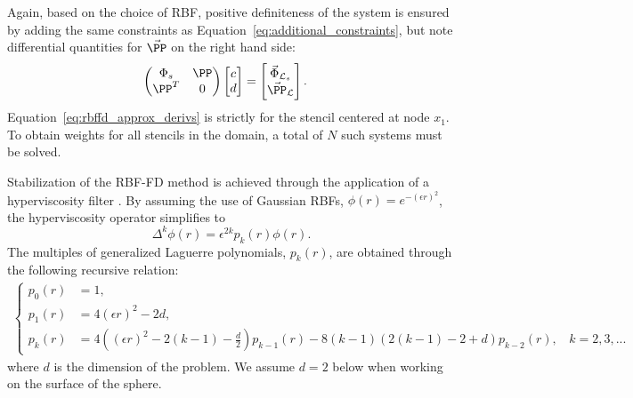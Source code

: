 	
Again, based on the choice of RBF, positive definiteness of the system is ensured by adding the same constraints as Equation~\ref{eq:additional_constraints}, but note differential quantities for $\vec{\PP}$ on the right hand side: 
	\begin{align}
		\begin{pmatrix}
		\Phi_s & \PP \\
		\PP^T & 0
		\end{pmatrix} \begin{bmatrix}
							c \\ 
							d
							\end{bmatrix}
				 &= \begin{bmatrix}
							\vec{\Phi}_{\diffop{}_s} \\
							\vec{\PP}_{\diffop{}}
							 \end{bmatrix}.
	\end{align}
Equation~\ref{eq:rbffd_approx_derivs} is strictly for the stencil centered at node $x_1$. To obtain weights for all stencils in the domain, a total of $N$ such systems must be solved. %


Stabilization of the RBF-FD method is achieved through the application of a hyperviscosity filter \cite{Fornberg2011b}. By assuming the use of Gaussian RBFs, $\phi(r) = e^{-(\epsilon r)^2}$, the hyperviscosity operator simplifies to
\begin{equation}
\Delta^{k}\phi(r) = \epsilon^{2k} p_k(r) \phi(r).
\label{eqn:gaussian_hv}
\end{equation}
The multiples of generalized Laguerre polynomials, $p_k(r)$, are obtained through the following recursive relation:
\begin{align*}
\begin{cases} 
p_0(r) &=1, \\
p_1(r) &= 4(\epsilon r)^2 - 2d, \\
p_k(r) &= 4((\epsilon r)^2 - 2(k-1) - \frac{d}{2})  p_{k-1}(r) - 8(k-1)(2(k-1) - 2 + d) p_{k-2}(r), \ \ \ \ k = 2, 3, ...
\end{cases}
\end{align*}
where $d$ is the dimension of the problem. We assume $d=2$ below when working on the surface of the sphere.

